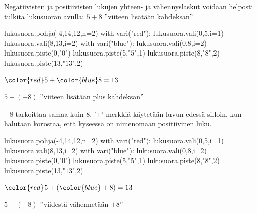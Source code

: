 Negatiivisten ja positiivisten lukujen yhteen- ja vähennyslaskut voidaan helposti tulkita lukusuoran avulla:
    $5+8$ ''viiteen lisätään kahdeksan''
    
\begin{center}
\begin{kuva}
	lukusuora.pohja(-4,14,12,n=2)
	with vari("red"):
		lukusuora.vali(0,5,i=1)
		lukusuora.vali(8,13,i=2)
	with vari("blue"): lukusuora.vali(0,8,i=2)
	lukusuora.piste(0,"$0$")
	lukusuora.piste(5,"$5$",1)
	lukusuora.piste(8,"$8$",2)
	lukusuora.piste(13,"$13$",2)
\end{kuva}
       ${\color{red}5}+{\color{blue}8}=13$
\end{center}
   
    $5+(+8)$ ''viiteen lisätään plus kahdeksan''
    
    $+8$ tarkoittaa samaa kuin $8$. '$+$'-merkkiä käytetään luvun edessä silloin, kun halutaan korostaa, että kyseessä on nimenomaan positiivinen luku.
    
    
\begin{center}
\begin{kuva}
	lukusuora.pohja(-4,14,12,n=2)
	with vari("red"):
		lukusuora.vali(0,5,i=1)
		lukusuora.vali(8,13,i=2)
	with vari("blue"): lukusuora.vali(0,8,i=2)
	lukusuora.piste(0,"$0$")
	lukusuora.piste(5,"$5$",1)
	lukusuora.piste(8,"$8$",2)
	lukusuora.piste(13,"$13$",2)
\end{kuva}
       ${\color{red}5}+({\color{blue}+8})=13$
\end{center}
    
    $5-(+8)$ ''viidestä vähennetään $+8$''
    
